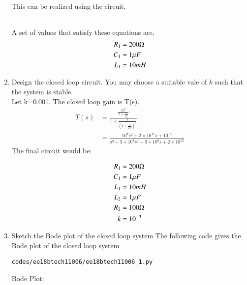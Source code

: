 \begin{enumerate}[label=\arabic*.,ref=\theenumi]
\begin{align}
\end{align}
This can be realized using the circuit,
\begin{figure}[!ht]
	\begin{center}
		\resizebox{\columnwidth}{!}{}
	\end{center}
\caption{}
\label{fig:ee18btech11006_2}
\end{figure} \\
A set of values that satisfy these equations are,
\begin{align}
R_1&= 200\ohm \\
C_1&= 1\mu F\\
L_1&= 10mH 
\end{align}
\item Design the closed loop circuit.  You may choose a suitable vale of $k$ such that the system is stable.\\
\solution Let k=0.001. The closed loop gain is T(s).
\begin{align}
    T(s)&=\frac{\frac{10^3}{1+\frac{s}{10^4}}}{1+\frac{1}{\left(1+\frac{s}{10^4}\right)^3}}\\
    &=\frac{10^7s^2+2\times10^{11}s+10^{15}}{s^3+3\times10^4s^2+3\times10^8s+2\times10^{12}}
\end{align}
The final circuit would be:
\begin{figure}[!ht]
	\begin{center}
		\resizebox{\columnwidth}{!}{}
	\end{center}
\caption{}
\label{fig:ee18btech11006_6}
\end{figure}
\begin{align}
R_1&= 200\ohm \\
C_1&= 1\mu F\\
L_1&= 10mH \\
L_2&=1\mu F\\
R_2&=100\ohm\\
k&=10^{-3}
\end{align}
\item Sketch the Bode plot of the closed loop system
\solution The following code gives the Bode plot of the closed loop system
\begin{lstlisting}
codes/ee18btech11006/ee18btech11006_1.py
\end{lstlisting}
Bode Plot:
\begin{figure}[ht!]
\centering

\end{figure}
\end{enumerate}
